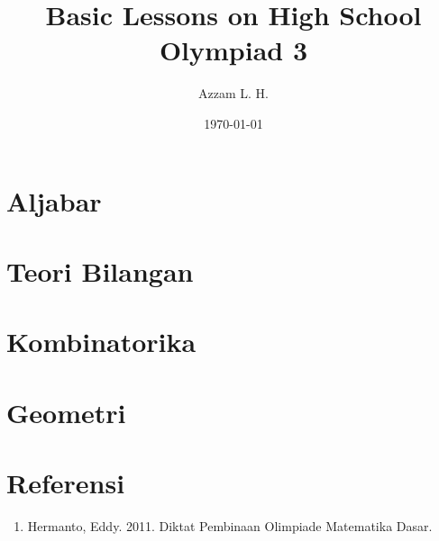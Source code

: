 \title{Basic Lessons on High School Olympiad 3}
\date{\today}
\author{Azzam L. H.}
\maketitle
\renewcommand*\contentsname{Daftar Isi}
\tableofcontents

\newpage
\section{Aljabar}



\section{Teori Bilangan}



\section{Kombinatorika}



\section{Geometri}







\section{Referensi}
    \begin{enumerate}
        \item Hermanto, Eddy. 2011. Diktat Pembinaan Olimpiade Matematika Dasar.
    \end{enumerate}



